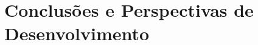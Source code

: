 \documentclass[runningheads,a4paper]{llncs}
\begin{document}
\section{Conclusões e Perspectivas de Desenvolvimento}
\end{document}
